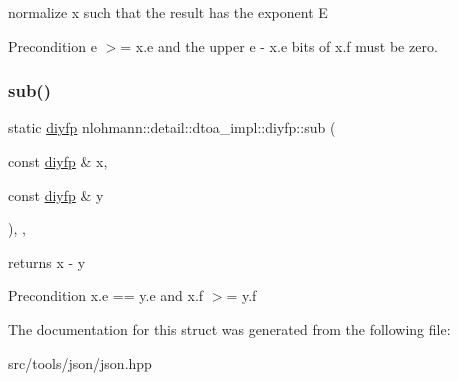 normalize x such that the result has the exponent E 

\begin{DoxyPrecond}{Precondition}
e $>$= x.\+e and the upper e -\/ x.\+e bits of x.\+f must be zero. 
\end{DoxyPrecond}
\mbox{\label{structnlohmann_1_1detail_1_1dtoa__impl_1_1diyfp_aeb26771af54ad73598c1a0430d65d884}} 
\subsubsection{\texorpdfstring{sub()}{sub()}}
{\footnotesize\ttfamily static \hyperlink{structnlohmann_1_1detail_1_1dtoa__impl_1_1diyfp}{diyfp} nlohmann\+::detail\+::dtoa\+\_\+impl\+::diyfp\+::sub (\begin{DoxyParamCaption}\item[{const \hyperlink{structnlohmann_1_1detail_1_1dtoa__impl_1_1diyfp}{diyfp} \&}]{x,  }\item[{const \hyperlink{structnlohmann_1_1detail_1_1dtoa__impl_1_1diyfp}{diyfp} \&}]{y }\end{DoxyParamCaption})\hspace{0.3cm}{\ttfamily [inline]}, {\ttfamily [static]}, {\ttfamily [noexcept]}}



returns x -\/ y 

\begin{DoxyPrecond}{Precondition}
x.\+e == y.\+e and x.\+f $>$= y.\+f 
\end{DoxyPrecond}


The documentation for this struct was generated from the following file\+:\begin{DoxyCompactItemize}
\item 
src/tools/json/json.\+hpp\end{DoxyCompactItemize}
